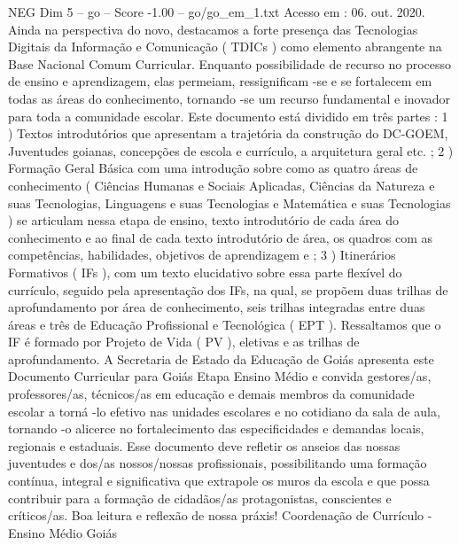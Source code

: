 \begin{textsample}{NEG Dim 5 – go – Score -1.00 – go/go\_em\_1.txt}
Acesso em : 06. out. 2020.
Ainda na perspectiva do novo, destacamos a forte presença das Tecnologias Digitais da Informação e Comunicação ( TDICs ) como elemento abrangente na Base Nacional Comum Curricular.
Enquanto possibilidade de recurso no processo de ensino e aprendizagem, elas permeiam, ressignificam -se e se fortalecem em todas as áreas do conhecimento, tornando -se um recurso fundamental e inovador para toda a comunidade escolar.
Este documento está dividido em três partes : 1 ) Textos introdutórios que apresentam a trajetória da construção do DC-GOEM, Juventudes goianas, concepções de escola e currículo, a arquitetura geral etc. ; 2 ) Formação Geral Básica com uma introdução sobre como as quatro áreas de conhecimento ( Ciências Humanas e Sociais Aplicadas, Ciências da Natureza e suas Tecnologias, Linguagens e suas Tecnologias e Matemática e suas Tecnologias ) se articulam nessa etapa de ensino, texto introdutório de cada área do conhecimento e ao final de cada texto introdutório de área, os quadros com as competências, habilidades, objetivos de aprendizagem e ; 3 ) Itinerários Formativos ( IFs ), com um texto elucidativo sobre essa parte flexível do currículo, seguido pela apresentação dos IFs, na qual, se propõem duas trilhas de aprofundamento por área de conhecimento, seis trilhas integradas entre duas áreas e três de Educação Profissional e Tecnológica ( EPT ).
Ressaltamos que o IF é formado por Projeto de Vida ( PV ), eletivas e as trilhas de aprofundamento.
A Secretaria de Estado da Educação de Goiás apresenta este Documento Curricular para Goiás Etapa Ensino Médio e convida gestores/as, professores/as, técnicos/as em educação e demais membros da comunidade escolar a torná -lo efetivo nas unidades escolares e no cotidiano da sala de aula, tornando -o alicerce no fortalecimento das especificidades e demandas locais, regionais e estaduais.
Esse documento deve refletir os anseios das nossas juventudes e dos/as nossos/nossas profissionais, possibilitando uma formação contínua, integral e significativa que extrapole os muros da escola e que possa contribuir para a formação de cidadãos/as protagonistas, conscientes e críticos/as.
Boa leitura e reflexão de nossa práxis!
Coordenação de Currículo - Ensino Médio Goiás

\end{textsample}
